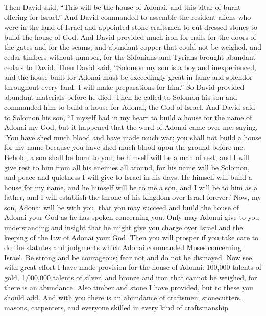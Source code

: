 \begin{biblechapter} %
\verse Then David said, “This will be the house of Adonai, and this altar of burnt offering for Israel.”
 And David commanded to assemble the resident aliens who were in the land of Israel and appointed stone craftsmen to cut dressed stones to build the house of God.
\verse And David provided much iron for nails for the doors of the gates and for the seams, and abundant copper that could not be weighed,
\verse and cedar timbers without number, for the Sidonians and Tyrians brought abundant cedars to David.
\verse Then David said, “Solomon my son is a boy and inexperienced, and the house built for Adonai must be exceedingly great in fame and splendor throughout every land. I will make preparations for him.” So David provided abundant materials before he died.
 Then he called to Solomon his son and commanded him to build a house for Adonai, the God of Israel.
\verse And David said to Solomon his son, “I myself had in my heart to build a house for the name of Adonai my God,
\verse but it happened that the word of Adonai came over me, saying, ‘You have shed much blood and have made much war; you shall not build a house for my name because you have shed much blood upon the ground before me.
\verse Behold, a son shall be born to you; he himself will be a man of rest, and I will give rest to him from all his enemies all around, for his name will be Solomon, and peace and quietness I will give to Israel in his days.
\verse He himself will build a house for my name, and he himself will be to me a son, and I will be to him as a father, and I will establish the throne of his kingdom over Israel forever.’
\verse Now, my son, Adonai will be with you, that you may succeed and build the house of Adonai your God as he has spoken concerning you.
\verse Only may Adonai give to you understanding and insight that he might give you charge over Israel and the keeping of the law of Adonai your God.
\verse Then you will prosper if you take care to do the statutes and judgments which Adonai commanded Moses concerning Israel. Be strong and be courageous; fear not and do not be dismayed.
\verse Now see, with great effort I have made provision for the house of Adonai: 100,000 talents of gold, 1,000,000 talents of silver, and bronze and iron that cannot be weighed, for there is an abundance. Also timber and stone I have provided, but to these you should add.
\verse And with you there is an abundance of craftsmen: stonecutters, masons, carpenters, and everyone skilled in every kind of craftsmanship

\end{biblechapter}
